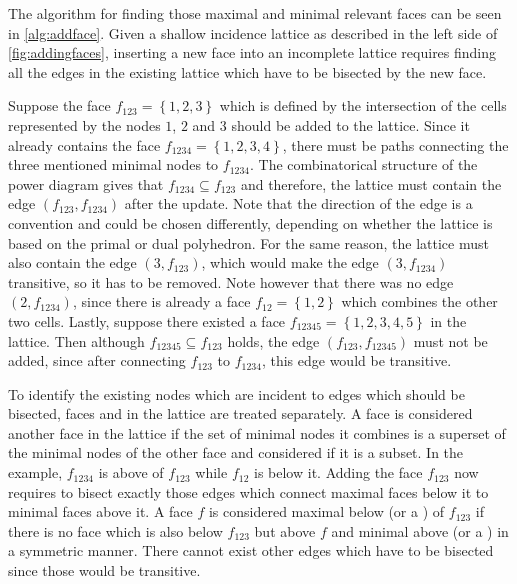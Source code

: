 The algorithm for finding those maximal and minimal relevant faces can be seen in \cref{alg:addface}.
Given a shallow incidence lattice as described in the left side of \cref{fig:addingfaces}, inserting a new face into an incomplete lattice requires finding all the edges in the existing lattice which have to be bisected by the new face.

Suppose the face $f_{123} = \left\{ 1, 2, 3 \right\}$ which is defined by the intersection of the cells represented by the nodes $1$, $2$ and $3$ should be added to the lattice.
Since it already contains the face $f_{1234} = \left\{ 1, 2, 3, 4 \right\}$, there must be paths connecting the three mentioned minimal nodes to $f_{1234}$.
The combinatorical structure of the power diagram gives that $f_{1234} \subseteq f_{123}$ and therefore, the lattice must contain the edge $(f_{123}, f_{1234})$ after the update.
Note that the direction of the edge is a convention and could be chosen differently, depending on whether the lattice is based on the primal or dual polyhedron.
For the same reason, the lattice must also contain the edge $(3, f_{123})$, which would make the edge $(3, f_{1234})$ transitive, so it has to be removed.
Note however that there was no edge $(2, f_{1234})$, since there is already a face $f_{12} = \left\{ 1, 2 \right\}$ which combines the other two cells.
Lastly, suppose there existed a face $f_{12345} = \left\{ 1, 2, 3, 4, 5 \right\}$ in the lattice.
Then although $f_{12345} \subseteq f_{123}$ holds, the edge $(f_{123}, f_{12345})$ must not be added, since after connecting $f_{123}$ to $f_{1234}$, this edge would be transitive.

To identify the existing nodes which are incident to edges which should be bisected, faces  and  in the lattice are treated separately.
A face is considered  another face in the lattice if the set of minimal nodes it combines is a superset of the minimal nodes of the other face and considered  if it is a subset.
In the example, $f_{1234}$ is above of $f_{123}$ while $f_{12}$ is below it.
Adding the face $f_{123}$ now requires to bisect exactly those edges which connect maximal faces below it to minimal faces above it.
A face $f$ is considered maximal below (or a ) of $f_{123}$ if there is no face which is also below $f_{123}$ but above $f$ and minimal above (or a ) in a symmetric manner.
There cannot exist other edges which have to be bisected since those would be transitive.

